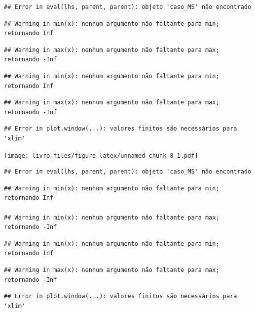 \documentclass[
  oneside]{book}
\begin{document}
\begin{verbatim}
## Error in eval(lhs, parent, parent): objeto 'caso_MS' não encontrado
\end{verbatim}

\begin{verbatim}
## Warning in min(x): nenhum argumento não faltante para min; retornando Inf
\end{verbatim}

\begin{verbatim}
## Warning in max(x): nenhum argumento não faltante para max; retornando -Inf
\end{verbatim}

\begin{verbatim}
## Warning in min(x): nenhum argumento não faltante para min; retornando Inf
\end{verbatim}

\begin{verbatim}
## Warning in max(x): nenhum argumento não faltante para max; retornando -Inf
\end{verbatim}

\begin{verbatim}
## Error in plot.window(...): valores finitos são necessários para 'xlim'
\end{verbatim}

\texttt{[image: livro\_files/figure-latex/unnamed-chunk-8-1.pdf]}

\begin{verbatim}
## Error in eval(lhs, parent, parent): objeto 'caso_MS' não encontrado
\end{verbatim}

\begin{verbatim}
## Warning in min(x): nenhum argumento não faltante para min; retornando Inf

## Warning in min(x): nenhum argumento não faltante para max; retornando -Inf
\end{verbatim}

\begin{verbatim}
## Warning in min(x): nenhum argumento não faltante para min; retornando Inf
\end{verbatim}

\begin{verbatim}
## Warning in max(x): nenhum argumento não faltante para max; retornando -Inf
\end{verbatim}

\begin{verbatim}
## Error in plot.window(...): valores finitos são necessários para 'xlim'
\end{verbatim}
\end{document}
